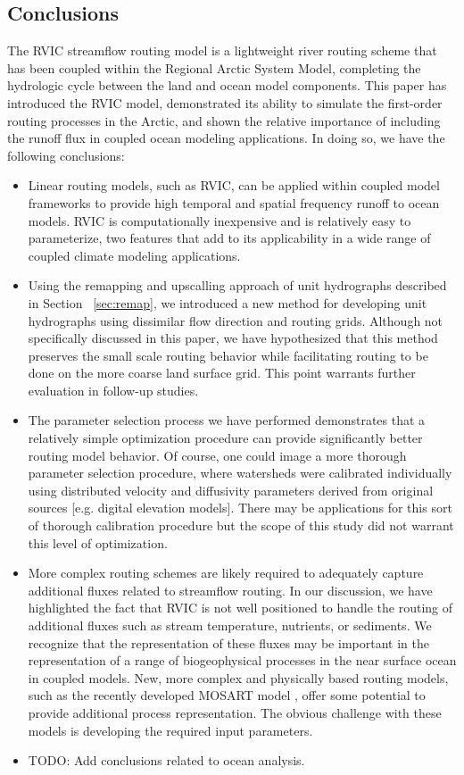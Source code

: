\documentclass[jgrga, draft]{agutex}
\begin{document}
\begin{article}
\section{Conclusions}

The RVIC streamflow routing model is a lightweight river routing scheme that has been coupled within the Regional Arctic System Model, completing the hydrologic cycle between the land and ocean model components.
This paper has introduced the RVIC model, demonstrated its ability to simulate the first-order routing processes in the Arctic, and shown the relative importance of including the runoff flux in coupled ocean modeling applications.
In doing so, we have the following conclusions:
\begin{itemize}
\item Linear routing models, such as RVIC, can be applied within coupled model frameworks to provide high temporal and spatial frequency runoff to ocean models.
RVIC is computationally inexpensive and is relatively easy to parameterize, two features that add to its applicability in a wide range of coupled climate modeling applications.
\item Using the remapping and upscalling approach of unit hydrographs described in Section ~\ref{sec:remap}, we introduced a new method for developing unit hydrographs using dissimilar flow direction and routing grids.
Although not specifically discussed in this paper, we have hypothesized that this method preserves the small scale routing behavior while facilitating routing to be done on the more coarse land surface grid.
This point warrants further evaluation in follow-up studies.
\item The parameter selection process we have performed demonstrates that a relatively simple optimization procedure can provide significantly better routing model behavior.
Of course, one could image a more thorough parameter selection procedure, where watersheds were calibrated individually using distributed velocity and diffusivity parameters derived from original sources [e.g. digital elevation models].
There may be applications for this sort of thorough calibration procedure but the scope of this study did not warrant this level of optimization.
\item More complex routing schemes are likely required to adequately capture additional fluxes related to streamflow routing.
In our discussion, we have highlighted the fact that RVIC is not well positioned to handle the routing of additional fluxes such as stream temperature, nutrients, or sediments.
We recognize that the representation of these fluxes may be important in the representation of a range of biogeophysical processes in the near surface ocean in coupled models.
New, more complex and physically based routing models, such as the recently developed MOSART model \citep{Li_2013}, offer some potential to provide additional process representation.
The obvious challenge with these models is developing the required input parameters.
\item TODO: Add conclusions related to ocean analysis.
\end{itemize}


\end{article}
\end{document}
